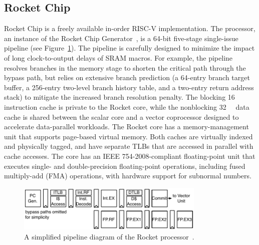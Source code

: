 \documentclass[graybox]{svmult}
\begin{document}
\subsection{Rocket Chip}

Rocket Chip is a freely available in-order RISC-V implementation.
The processor, an instance of the Rocket Chip Generator~\cite{Rocket2016}, is a 64-bit five-stage single-issue pipeline (see Figure~\ref{fig:6-raven3-rocket}).
The pipeline is carefully designed to minimize the impact of long clock-to-output delays of SRAM macros.
For example, the pipeline resolves branches in the memory stage to shorten the critical path through the bypass path, but relies on extensive branch prediction (a 64-entry branch target buffer, a 256-entry two-level branch history table, and a two-entry return address stack) to mitigate the increased branch resolution penalty.
The blocking \SI{16}{\kibi\byte} instruction cache is private to the Rocket core, while the nonblocking \SI{32}{\kibi\byte} data cache is shared between the scalar core and a vector coprocessor designed to accelerate data-parallel workloads.
The Rocket core has a memory-management unit that supports page-based virtual memory.
Both caches are virtually indexed and physically tagged, and have separate TLBs that are accessed in parallel with cache accesses.
The core has an IEEE 754-2008-compliant floating-point unit that executes single- and double-precision floating-point operations, including fused multiply-add (FMA) operations, with hardware support for subnormal numbers.

\begin{figure}
  \centering
  \includegraphics[width=0.8\textwidth]{6-raven3-rocket}
  \caption{A simplified pipeline diagram of the Rocket processor~\cite{Zimmer2016}.}
  \label{fig:6-raven3-rocket}
\end{figure}

\end{document}
